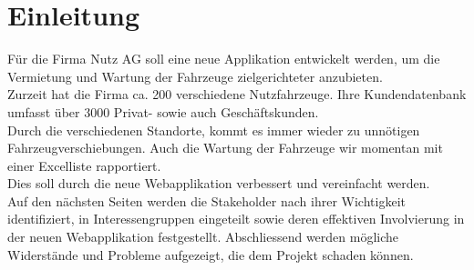 \section{Einleitung}
Für die Firma Nutz AG soll eine neue Applikation entwickelt werden, um die Vermietung und Wartung der Fahrzeuge zielgerichteter anzubieten.\\
Zurzeit hat die Firma ca. 200 verschiedene Nutzfahrzeuge. Ihre Kundendatenbank umfasst über 3000 Privat- sowie auch Geschäftskunden.\\
Durch die verschiedenen Standorte, kommt es immer wieder zu unnötigen Fahrzeugverschiebungen. Auch die Wartung der Fahrzeuge wir momentan mit einer Excelliste rapportiert.\\[2ex]
%
Dies soll durch die neue Webapplikation verbessert und vereinfacht werden.\\
Auf den nächsten Seiten werden die Stakeholder nach ihrer Wichtigkeit identifiziert, in Interessengruppen eingeteilt sowie deren effektiven Involvierung in der neuen Webapplikation festgestellt. Abschliessend werden mögliche Widerstände und Probleme aufgezeigt, die dem Projekt schaden können.\\
